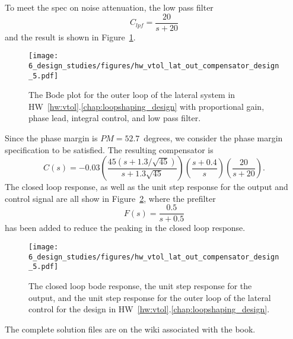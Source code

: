 To meet the spec on noise attenuation, the low pass filter
\[
C_{lpf} = \frac{20}{s+20}
\]
and the result is shown in Figure~\ref{fig:hw_vtol_lat_out_compensator_design_5}.
\begin{figure}[H]
   \centering
   \texttt{[image: 6\_design\_studies/figures/hw\_vtol\_lat\_out\_compensator\_design\_5.pdf]}
   \caption{The Bode plot for the outer loop of the lateral system in HW~\ref{hw:vtol}.\ref{chap:loopshaping_design} with proportional gain, phase lead, integral control, and low pass filter.}
   \label{fig:hw_vtol_lat_out_compensator_design_5}
\end{figure}
Since the phase margin is $PM=52.7$~degrees, we consider the phase margin specification to be satisfied.
The resulting compensator is
\[
C(s) = -0.03\left(\frac{45(s+1.3/\sqrt{45})}{s+1.3\sqrt{45}}\right)\left(\frac{s+0.4}{s}\right)\left(\frac{20}{s+20}\right).
\]
The closed loop response, 
as well as the unit step response for the output and control signal are all show in Figure~\ref{fig:hw_vtol_lat_out_compensator_design_6}, where the prefilter
\[
F(s) = \frac{0.5}{s+0.5}
\]
has been added to reduce the peaking in the closed loop response.
\begin{figure}[H]
   \centering
   \texttt{[image: 6\_design\_studies/figures/hw\_vtol\_lat\_out\_compensator\_design\_5.pdf]}
   \caption{The closed loop bode response, the unit step response for the output, and the unit step response for the outer loop of the lateral control for the design in HW~\ref{hw:vtol}.\ref{chap:loopshaping_design}.}
   \label{fig:hw_vtol_lat_out_compensator_design_6}
\end{figure}

The complete solution files are on the wiki associated with the book.



